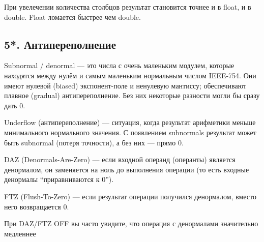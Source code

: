 \documentclass[a4paper, 12pt]{article}
\begin{document}
При увелечении количества столбцов результат становится точнее и в float, и в double. Float ломается быстрее чем double.

\newpage

\subsection*{5*. Антипереполнение}

Subnormal / denormal — это числа с очень маленьким модулем, которые находятся между нулём и самым маленьким нормальным числом IEEE-754. Они имеют нулевой (biased) экспонент-поле и ненулевую мантиссу; обеспечивают плавное (gradual) антипереполнение. Без них некоторые разности могли бы сразу дать 0.

Underflow (антипереполнение) — ситуация, когда результат арифметики меньше минимального нормального значения. С появлением subnormals результат может быть subnormal (потеря точности), а без них — прямо 0.

DAZ (Denormals-Are-Zero) — если входной операнд (операнты) является денормалом, он заменяется на ноль до выполнения операции (то есть входные денормалы “приравниваются к 0”).

FTZ (Flush-To-Zero) — если результат операции получился денормалом, вместо него возвращается 0.

При DAZ/FTZ OFF вы часто увидите, что операция с денормалами значительно медленнее
\end{document}
